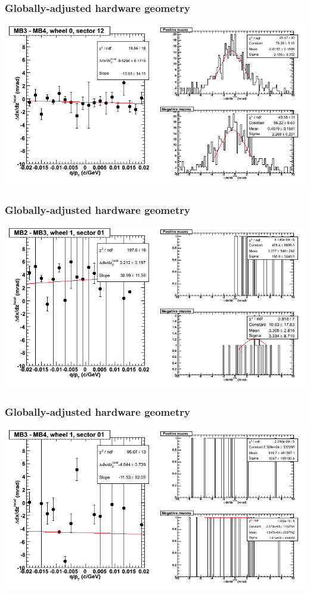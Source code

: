 \documentclass[compress]{beamer}
\begin{document}
\begin{frame}
\frametitle{Globally-adjusted hardware geometry}
\includegraphics[width=\linewidth]{NOV4_segdiffs_HW/dt13_slope_C_12_34.png}
\end{frame}

\begin{frame}
\frametitle{Globally-adjusted hardware geometry}
\includegraphics[width=\linewidth]{NOV4_segdiffs_HW/dt13_slope_D_01_23.png}
\end{frame}

\begin{frame}
\frametitle{Globally-adjusted hardware geometry}
\includegraphics[width=\linewidth]{NOV4_segdiffs_HW/dt13_slope_D_01_34.png}
\end{frame}
\end{document}
